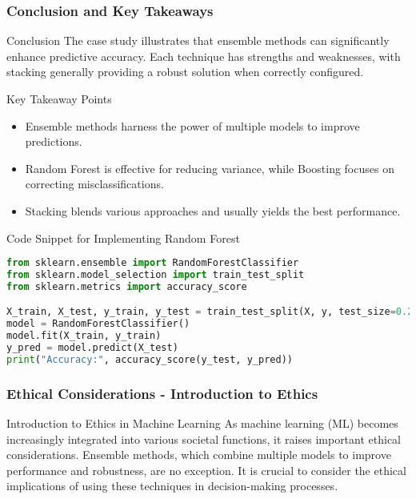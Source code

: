 \documentclass[aspectratio=169]{beamer}
\begin{document}
\begin{frame}
    \frametitle{Conclusion and Key Takeaways}
    
    \begin{block}{Conclusion}
        The case study illustrates that ensemble methods can significantly enhance predictive accuracy. 
        Each technique has strengths and weaknesses, with stacking generally providing a robust solution when correctly configured.
    \end{block}

    \begin{block}{Key Takeaway Points}
        \begin{itemize}
            \item Ensemble methods harness the power of multiple models to improve predictions.
            \item Random Forest is effective for reducing variance, while Boosting focuses on correcting misclassifications.
            \item Stacking blends various approaches and usually yields the best performance.
        \end{itemize}
    \end{block}
    
    \begin{block}{Code Snippet for Implementing Random Forest}
    \begin{lstlisting}[language=Python]
from sklearn.ensemble import RandomForestClassifier
from sklearn.model_selection import train_test_split
from sklearn.metrics import accuracy_score

X_train, X_test, y_train, y_test = train_test_split(X, y, test_size=0.2, random_state=42)
model = RandomForestClassifier()
model.fit(X_train, y_train)
y_pred = model.predict(X_test)
print("Accuracy:", accuracy_score(y_test, y_pred))
    \end{lstlisting}
    \end{block}
\end{frame}

\begin{frame}[fragile]
    \frametitle{Ethical Considerations - Introduction to Ethics}
    \begin{block}{Introduction to Ethics in Machine Learning}
        As machine learning (ML) becomes increasingly integrated into various societal functions, it raises important ethical considerations. Ensemble methods, which combine multiple models to improve performance and robustness, are no exception. It is crucial to consider the ethical implications of using these techniques in decision-making processes.
    \end{block}
\end{frame}
\end{document}
